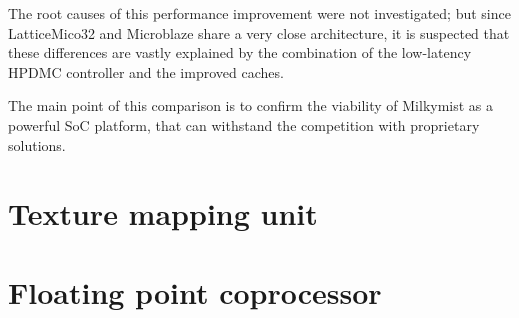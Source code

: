 \documentclass[a4paper,11pt]{kthesis}
\begin{document}
The root causes of this performance improvement were not investigated; but since LatticeMico32 and Microblaze share a very close architecture, it is suspected that these differences are vastly explained by the combination of the low-latency HPDMC controller and the improved caches.

The main point of this comparison is to confirm the viability of Milkymist as a powerful SoC platform, that can withstand the competition with proprietary solutions.

\chapter{Texture mapping unit}
\label{ch:tmu}

\chapter{Floating point coprocessor}

{}

\end{document}
